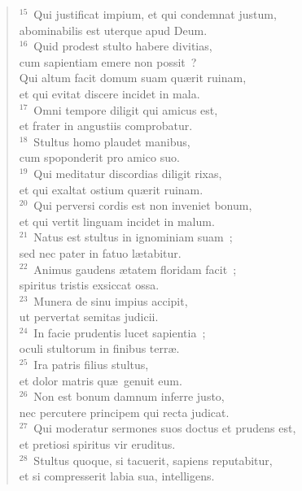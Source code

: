 \begin{flushleft}\begin{verse}${}^{15}$~Qui justificat impium, et qui condemnat justum,\\ abominabilis est uterque apud Deum.\\
${}^{16}$~Quid prodest stulto habere divitias,\\ cum sapientiam emere non possit~?\\ Qui altum facit domum suam qu\ae rit ruinam,\\ et qui evitat discere incidet in mala.\\
${}^{17}$~Omni tempore diligit qui amicus est,\\ et frater in angustiis comprobatur.\\
${}^{18}$~Stultus homo plaudet manibus,\\ cum spoponderit pro amico suo.\\
${}^{19}$~Qui meditatur discordias diligit rixas,\\ et qui exaltat ostium qu\ae rit ruinam.\\
${}^{20}$~Qui perversi cordis est non inveniet bonum,\\ et qui vertit linguam incidet in malum.\\
${}^{21}$~Natus est stultus in ignominiam suam~;\\ sed nec pater in fatuo l\ae tabitur.\\
${}^{22}$~Animus gaudens \ae tatem floridam facit~;\\ spiritus tristis exsiccat ossa.\\
${}^{23}$~Munera de sinu impius accipit,\\ ut pervertat semitas judicii.\\
${}^{24}$~In facie prudentis lucet sapientia~;\\ oculi stultorum in finibus terr\ae .\\
${}^{25}$~Ira patris filius stultus,\\ et dolor matris qu\ae\ genuit eum.\\
${}^{26}$~Non est bonum damnum inferre justo,\\ nec percutere principem qui recta judicat.\\
${}^{27}$~Qui moderatur sermones suos doctus et prudens est,\\ et pretiosi spiritus vir eruditus.\\
${}^{28}$~Stultus quoque, si tacuerit, sapiens reputabitur,\\ et si compresserit labia sua, intelligens.\end{verse}\end{flushleft}


